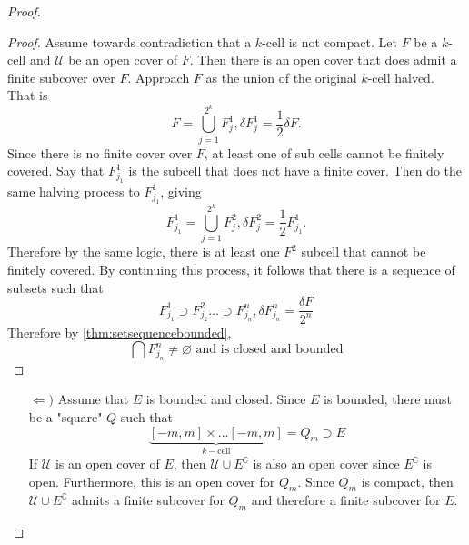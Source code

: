 \documentclass[../notes.tex]{subfiles}
\begin{document}
\begin{proof}
    \begin{proof}
        Assume towards contradiction that a $k$-cell is not compact. Let $F$ be a $k$-cell and $\mathcal{U}$ be an open cover of $F$. Then there is an open cover that does admit a finite subcover over $F$. Approach $F$ as the union of the original $k$-cell halved. That is
        \[
            F = \bigcup_{j=1}^{2^k} F_j^1, \delta F_{j}^1 = \frac{1}{2} \delta F
        .\]
        Since there is no finite cover over $F$, at least one of sub cells cannot be finitely covered. Say that $F^1_{j_1}$ is the subcell that does not have a finite cover. Then do the same halving process to $F^1_{j_1}$, giving
        \[
            F^1_{j_1} = \bigcup_{j=1}^{2^k} F^2_{j}, \delta F_j^2 = \frac{1}{2} F^1_{j_1}
        .\]
        Therefore by the same logic, there is at least one $F^2$ subcell that cannot be finitely covered. By continuing this process, it follows that there is a sequence of subsets such that
        \[
            F^1_{j_1} \supset F^2_{j_2} \ldots \supset F^n_{j_n}, \delta F^n_{j_n} = \frac{\delta F}{2^n}
        \]
        Therefore by \ref{thm:setsequencebounded},
        \[
            \bigcap F^n_{j_n} \neq \varnothing \text{ and is closed and bounded}
        \]
    \end{proof}

    \begin{enumerate}
        \item[$\Leftarrow)$]
            Assume that $E$ is bounded and closed. Since $E$ is bounded, there must be a "square" $Q$ such that
            \[
                \underbrace{[-m, m] \times \ldots [-m, m]}_{k-\text{cell}} = Q_m \supset E
            \]
            If $\mathcal{U}$ is an open cover of $E$, then $\mathcal{U} \cup E^\complement$ is also an open cover since $E^\complement$ is open. Furthermore, this is an open cover for $Q_m$. Since $Q_m$ is compact, then $\mathcal{U} \cup E^\complement$ admits a finite subcover for $Q_m$ and therefore a finite subcover for $E$.
    \end{enumerate}
\end{proof}
\end{document}
